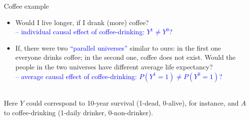 \documentclass[10pt,dvipsnames,t,handout%
,aspectratio=169%
]{beamer}%
\newcommand{\sini}[1]{\textcolor{Blue}{#1}}
\begin{document}
\begin{frame}
	\begin{block}{Coffee example}
		 	\begin{itemize}
		\item 		Would I live longer, if I drank (more) coffee? \\[2mm]	\sini{-- individual causal effect of coffee-drinking: $Y^1 \ne Y^0$?} \\
		\item If, there were two \sini{``parallel universes''} similar to ours: in the first one everyone drinks coffee;  
		in the second one, coffee does not exist. 
		Would the people in the two universes have different average life expectancy? \\[2mm]
		\sini{-- average causal effect of coffee-drinking: $P(Y^{1}=1) \ne  P(Y^{0}=1)$?} 
	\end{itemize}
			\end{block}
\mbox{ }\\[3mm]
Here $Y$ could correspond to 10-year survival (1-dead, 0-alive), for instance, and $A$ to coffee-drinking (1-daily drinker, 0-non-drinker).
\end{frame}


\end{document}
